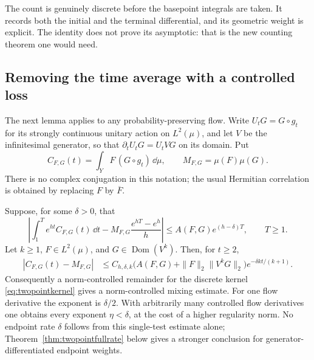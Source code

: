 The count is genuinely discrete before the basepoint integrals are
taken. It records both the initial and the terminal differential,
and its geometric weight is explicit. The identity does not prove
its asymptotic: that is the new counting theorem one would need.

\subsection{Removing the time average with a controlled loss}
\label{subsec:twopointdeaverage}

The next lemma applies to any probability-preserving flow. Write
$U_tG=G\circ g_t$ for its strongly continuous unitary action on
$L^2(\mu)$, and let $V$ be the infinitesimal generator, so that
$\partial_tU_tG=U_tVG$ on its domain. Put
\[
 C_{F,G}(t)=\int_Y F\,(G\circ g_t)\,\dd\mu,
 \qquad M_{F,G}=\mu(F)\mu(G).
\]
There is no complex conjugation in this notation; the usual
Hermitian correlation is obtained by replacing $F$ by $\overline F$.

\begin{theorem}
\label{thm:twopointconverse}
Suppose, for some $\delta>0$, that
\begin{equation}
 \left|\int_1^T e^{ht}C_{F,G}(t)\,\dd t
       -M_{F,G}\frac{e^{hT}-e^h}{h}\right|
 \leq A(F,G)e^{(h-\delta)T},\qquad T\geq1.
 \label{eq:twopointcountassumption}
\end{equation}
Let $k\geq1$, $F\in L^2(\mu)$, and
$G\in\operatorname{Dom}(V^k)$. Then, for $t\geq2$,
\begin{equation}
 \begin{split}
 |C_{F,G}(t)-M_{F,G}|
 &\leq C_{h,\delta,k}
    \bigl(A(F,G)+\|F\|_2\|V^kG\|_2\bigr)
       e^{-\delta k t/(k+1)}.
 \end{split}
 \label{eq:twopointmixrate}
\end{equation}
Consequently a norm-controlled remainder for the discrete kernel
\eqref{eq:twopointkernel} gives a norm-controlled mixing estimate.
For one flow derivative the exponent is $\delta/2$. With arbitrarily
many controlled flow derivatives one obtains every exponent
$\eta<\delta$, at the cost of a higher regularity norm. No endpoint
rate $\delta$ follows from this single-test estimate alone;
Theorem~\ref{thm:twopointfullrate} below gives a stronger conclusion
for generator-differentiated endpoint weights.
\end{theorem}

